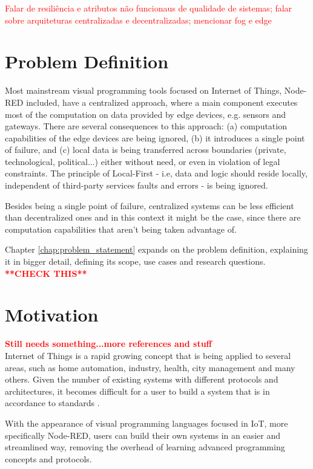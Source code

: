 \textcolor{red}{Falar de resiliência e atributos não funcionaus de qualidade de sistemas; falar sobre arquiteturas centralizadas e decentralizadas; mencionar fog e edge}

\section{Problem Definition} \label{sec:problem_definition}

Most mainstream visual programming tools focused on Internet of Things, Node-RED included, have a centralized approach, where a main component executes most of the computation on data provided by edge devices, e.g. sensors and gateways. There are several consequences to this approach: (a) computation capabilities of the edge devices are being ignored, (b) it introduces a single point of failure, and (c) local data is being transferred across boundaries (private, technological, political...) either without need, or even in violation of legal constraints. The principle of Local-First - i.e, data and logic should reside locally, independent of third-party services faults and errors - is being ignored. 
\par Besides being a single point of failure, centralized systems can be less efficient than decentralized ones and in this context it might be the case, since there are computation capabilities that aren't being taken advantage of.
\par Chapter \ref{chap:problem_statement} expands on the problem definition, explaining it in bigger detail, defining its scope, use cases and research questions. \textcolor{red}{\textbf{**CHECK THIS**}}

\section{Motivation} \label{sec:motivation}

\textcolor{red}{\textbf{Still needs something...more references and stuff}}\\
Internet of Things is a rapid growing concept that is being applied to several areas, such as home automation, industry, health, city management and many others. Given the number of existing systems with different protocols and architectures, it becomes difficult for a user to build a system that is in accordance to standards \cite{standard-iot}. 
\par With the appearance of visual programming languages focused in IoT, more specifically Node-RED, users can build their own systems in an easier and streamlined way, removing the overhead of learning advanced programming concepts and protocols.   

